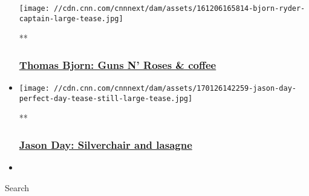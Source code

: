 \begin{itemize}
  \texttt{[image: //cdn.cnn.com/cnnnext/dam/assets/161206165814-bjorn-ryder-captain-large-tease.jpg]}

  **

  \hypertarget{thomas-bjorn-guns-n-roses--coffee}{%
  \subsubsection{\texorpdfstring{\href{/videos/sports/2018/02/06/thomas-bjorn-perfect-day-tiger-woods-gin-tonic-guns-n-roses-living-golf-orig.cnn}{Thomas
  Bjorn: Guns N' Roses \&
  coffee}}{Thomas Bjorn: Guns N' Roses \& coffee}}\label{thomas-bjorn-guns-n-roses--coffee}}
\item
  \href{/videos/sports/2017/01/26/jason-day-perfect-day-living-golf-tiger-woods-orig.cnn}{}

  \texttt{[image: //cdn.cnn.com/cnnnext/dam/assets/170126142259-jason-day-perfect-day-tease-still-large-tease.jpg]}

  **

  \hypertarget{jason-day-silverchair-and-lasagne}{%
  \subsubsection{\texorpdfstring{\href{/videos/sports/2017/01/26/jason-day-perfect-day-living-golf-tiger-woods-orig.cnn}{Jason
  Day: Silverchair and
  lasagne}}{Jason Day: Silverchair and lasagne}}\label{jason-day-silverchair-and-lasagne}}
\end{itemize}

\begin{itemize}
\item
\end{itemize}

Search

